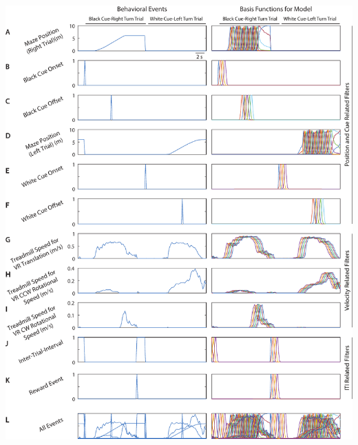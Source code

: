 \begin{FPfigure}
\includegraphics[width=\textwidth]{figures/4_filters.pdf}
\caption[Basis functions for encoding model.]{\textbf{Basis functions for encoding model.} Trial and behavioral measurements during each imaging frame (left) were expanded into a set of basis functions that were incorporated into the GLM (right). Filter groupings used in contribution calculation for Figure \ref{fig:decoding} shown in right margin.
\textbf{a,} Left: Maze position on right turn trials. Right: 36 spatial boxcar filters of position spanning the length of the maze were convolved with a Gaussian filter for right turn trials. 
%
\textbf{b,} Left: Black cue onset. Right: 4 Gaussian basis functions that span the first 2 seconds of black cue-right turn trials. 
%
\textbf{c,} Left: Black cue offset (delay period onset). Right: 6 total basis functions, 2 basis functions extended for 1 second preceding cue offset and 4 basis functions extended for 2 seconds following cue offset.
%
\textbf{d,} Left: Maze position on left turn trials. Right: 36 spatial boxcar filters of position spanning the length of the maze were convolved with a Gaussian filter for left turn trials.
}
\end{FPfigure}
